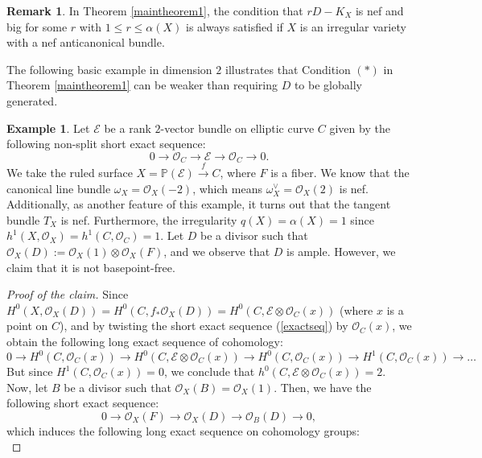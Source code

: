 \documentclass[sn-mathphys-num]{sn-jnl}%
\theoremstyle{definition}
\newtheorem{remark}[theorem]{Remark}
\newtheorem{example}[theorem]{Example}
\numberwithin{equation}{section}
\begin{document}
\begin{remark}
In Theorem \ref{maintheorem1}, the condition that $rD - K_{X}$ is nef and big for some $r$ with $1 \leq r \leq \alpha(X)$  is always satisfied if  $X$ is an irregular variety with a nef anticanonical bundle.
\end{remark}
\par The following basic example in dimension $2$ illustrates that  Condition $(*)$ in Theorem \ref{maintheorem1} can be weaker than requiring $D$ to be globally generated. 
\begin{example}\label{simpleexample}
Let $\mathcal{E}$ be a rank $2$-vector bundle on elliptic curve $C$ given by the following non-split short exact sequence:
\begin{equation}\label{exactseq}
0 \to \mathcal{O}_{C} \to \mathcal{E} \to \mathcal{O}_{C} \to 0  \text{.}
\end{equation}
We take the ruled surface \( X = \mathbb{P}(\mathcal{E}) \xrightarrow{f} C \), where $F$ is a fiber. We know that the canonical line bundle \( \omega_{X} = \mathcal{O}_{X}(-2) \), which means \( \omega_{X}^{\vee} = \mathcal{O}_{X}(2) \) is nef. Additionally, as another feature of this example, it turns out that the tangent bundle $T_{X}$ is nef. Furthermore, the irregularity \( q(X) = \alpha(X) = 1 \) since \( h^{1}(X, \mathcal{O}_{X}) = h^{1}(C, \mathcal{O}_{C}) = 1 \). Let \( D \) be a divisor such that \( \mathcal{O}_{X}(D) := \mathcal{O}_{X}(1) \otimes \mathcal{O}_{X}(F) \), and we observe that \( D \) is ample. However, we claim that it is not basepoint-free.
\begin{proof}[Proof of the claim]
Since \( H^{0}(X, \mathcal{O}_{X}(D)) = H^{0}(C, f_{*}\mathcal{O}_{X}(D)) = H^{0}(C, \mathcal{E} \otimes \mathcal{O}_{C}(x)) \) (where \( x \) is a point on \( C \)), and by twisting the short exact sequence (\ref{exactseq}) by \( \mathcal{O}_{C}(x) \), we obtain the following long exact sequence of cohomology:
\[
    0 \to H^{0}(C, \mathcal{O}_{C}(x)) \to H^{0}(C, \mathcal{E} \otimes \mathcal{O}_{C}(x)) \to H^{0}(C, \mathcal{O}_{C}(x)) \to H^{1}(C, \mathcal{O}_{C}(x)) \to \dots
\]
But since \( H^{1}(C, \mathcal{O}_{C}(x)) = 0 \), we conclude that \( h^{0}(C, \mathcal{E} \otimes \mathcal{O}_{C}(x)) = 2 \). Now, let \( B \) be a divisor such that \( \mathcal{O}_{X}(B) = \mathcal{O}_{X}(1) \). Then, we have the following short exact sequence:
\[
0 \to \mathcal{O}_{X}(F) \to \mathcal{O}_{X}(D) \to \mathcal{O}_{B}(D) \to 0,
\]
which induces the following long exact sequence on cohomology groups:
\begin{equation}\label{exactseq1}

\end{equation}
\end{proof}
\end{example}
\end{document}
